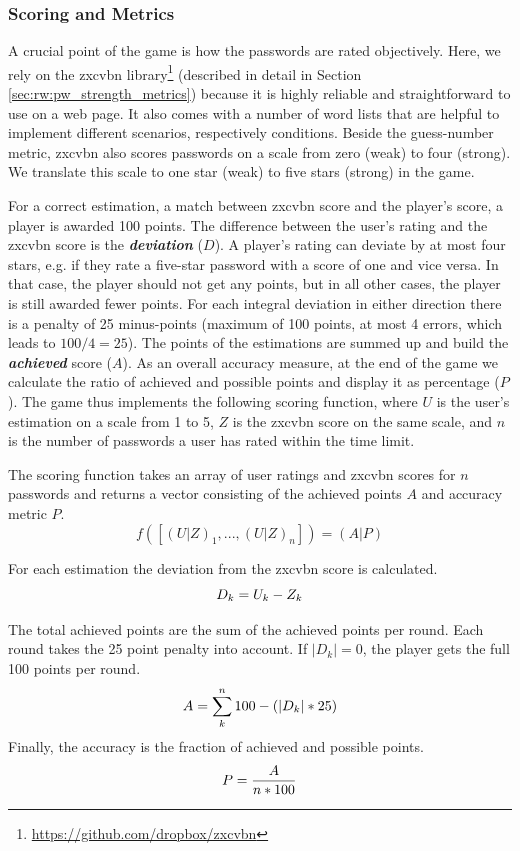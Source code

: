 \subsubsection{Scoring and Metrics}
A crucial point of the game is how the passwords are rated objectively. Here, we rely on the zxcvbn library\footnote{\url{https://github.com/dropbox/zxcvbn}} (described in detail in Section \ref{sec:rw:pw_strength_metrics}) because it is highly reliable and straightforward to use on a web page. It also comes with a number of word lists that are helpful to implement different scenarios, respectively conditions. Beside the guess-number metric, zxcvbn also scores passwords on a scale from zero (weak) to four (strong). We translate this scale to one star (weak) to five stars (strong) in the game. 

For a correct estimation, a match between zxcvbn score and the player's score, a player is awarded 100 points. The difference between the user's rating and the zxcvbn score is the \textbf{\textit{deviation}} ($D$). A player's rating can deviate by at most four stars, e.g. if they rate a five-star password with a score of one and vice versa. In that case, the player should not get any points, but in all other cases, the player is still awarded fewer points. For each integral deviation in either direction there is a penalty of 25 minus-points (maximum of 100 points, at most 4 errors, which leads to $100 / 4 = 25$). The points of the estimations are summed up and build the \textbf{\textit{achieved}} score ($A$). As an overall accuracy measure, at the end of the game we calculate the ratio of achieved and possible points and display it as percentage ($P$). The game thus implements the following scoring function, where $U$ is the user's estimation on a scale from 1 to 5, $Z$ is the zxcvbn score on the same scale, and $n$ is the number of passwords a user has rated within the time limit. 

\noindent The scoring function takes an array of user ratings and zxcvbn scores for $n$ passwords and returns a vector consisting of the achieved points $A$ and accuracy metric $P$.
\[
f([(U|Z)_1, ..., (U|Z)_n]) = (A|P)
\]

\noindent For each estimation the deviation from the zxcvbn score is calculated.
\[
D_k = U_k - Z_k\\
\]

\noindent The total achieved points are the sum of the achieved points per round. Each round takes the 25 point penalty into account. If $|D_k|=0$, the player gets the full 100 points per round.
\[
A = \sum_{k}^{n} 100 - (|D_k|*25) \\
\]
\noindent Finally, the accuracy is the fraction of achieved and possible points. 
\[
P = \frac{A}{n * 100}\\
\]

